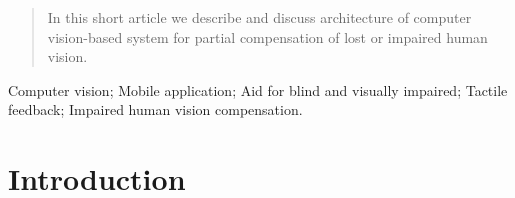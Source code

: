 \documentclass[10pt,conference,compsocconf]{IEEEtran}
\begin{document}




\maketitle


\begin{abstract}
In this short article we describe and discuss architecture of computer vision-based system for partial compensation of lost or impaired human vision.
\end{abstract}


\begin{IEEEkeywords}
Computer vision; Mobile application; Aid for blind and visually impaired; Tactile feedback; Impaired human vision compensation.%
\end{IEEEkeywords}



%
\IEEEpeerreviewmaketitle


\section{Introduction}
\label{sec:introduction}
\end{document}
